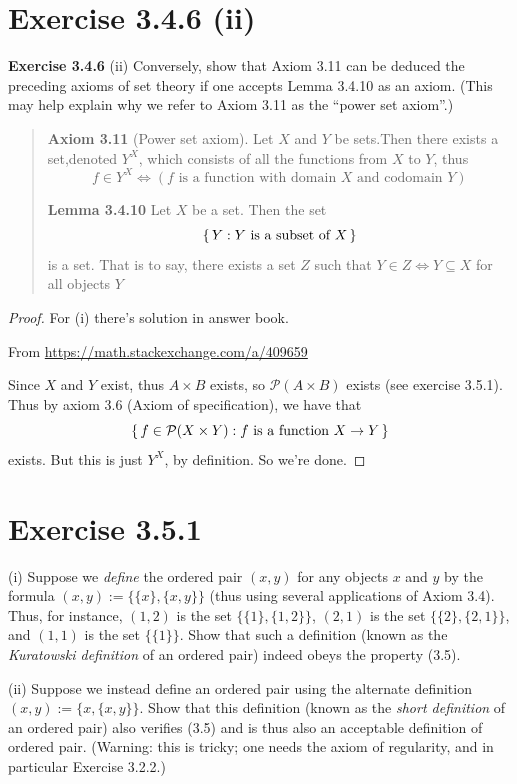 \documentclass{article}
\begin{document}
\section{Exercise 3.4.6 (ii)}
\textbf{Exercise 3.4.6} (ii)
Conversely, show that Axiom 3.11 can be deduced the preceding axioms of set theory if one
accepts Lemma 3.4.10 as an axiom. (This may help explain why we refer to Axiom 3.11 as
the “power set axiom”.)

\begin{quotation}
    \textbf{Axiom 3.11} (Power set axiom).
    Let $X$ and $Y$ be sets.Then there exists a set,denoted
    $Y^X$, which consists of all the functions from $X$ to $Y$, thus
    \[f \in Y^X \iff (f \text{ is a function with domain }X\text{ and codomain }Y)\]

    \textbf{Lemma 3.4.10} Let $X$ be a set. Then the set
    \[\set{Y : Y \text{ is a subset of }X}\]
    is a set. That is to say, there exists a set $Z$ such that
    $Y \in Z\iff Y \subseteq X$
    for all objects $Y$
\end{quotation}
\begin{proof}
    For (i) there's solution in answer book.

    From \url{https://math.stackexchange.com/a/409659}

    Since $X$ and $Y$ exist, thus $A\times B$ exists, so $\mathcal{P}(A\times B)$
    exists (see exercise 3.5.1). Thus by axiom 3.6 (Axiom of specification), we have that
    \[\set{f\in \mathcal{P}(X\times Y):f\text{ is a function }X\to Y}\]
    exists. But this is just $Y^X$, by definition. So we're done.
\end{proof}

\section{Exercise 3.5.1}
 (i) Suppose we \textit{define} the ordered pair $(x, y)$
for any objects $x$ and $y$ by the formula $(x, y) := \{\{x\}, \{x, y\}\}$
(thus using several applications of Axiom 3.4).
Thus, for instance, $(1,2)$ is the set $\{\{1\}, \{1,2\}\}$,
$(2,1)$ is the set $\{\{2\}, \{2,1\}\}$,
and $(1,1)$ is the set $\{\{1\}\}$.
Show that such a definition (known as the \textit{Kuratowski definition} of an ordered pair)
indeed obeys the property (3.5).

(ii) Suppose we instead define an ordered pair using the alternate definition $(x, y) := \{x, \{x, y\}\}$.
Show that this definition (known as the \textit{short definition} of an ordered pair)
also verifies (3.5) and is thus also an acceptable definition of ordered pair.
(Warning: this is tricky; one needs the axiom of regularity, and in particular Exercise 3.2.2.)
\end{document}
